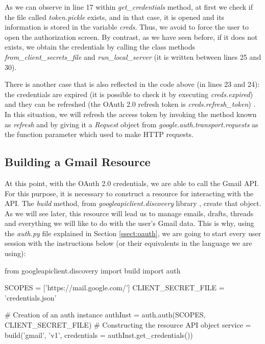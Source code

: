 As we can observe in line 17 within \textit{get\_credentials} method, at first we check if the file called \textit{token.pickle} exists, and in that case, it is opened and its information is stored in the variable \textit{creds}. Thus, we avoid to force the user to open the authorization screen. By contrast, as we have seen before, if it does not exists, we obtain the credentials by calling the class methods \textit{from\_client\_secrets\_file} and \textit{run\_local\_server} (it is written between lines 25 and 30).

There is another case that is also reflected in the code above (in lines 23 and 24): the credentials are expired (it is possible to check it by executing \textit{creds.expired}) and they can be refreshed (the OAuth 2.0 refresh token is \textit{creds.refresh\_token}) \citep{oauth2.credentials}. In this situation, we will refresh the access token by invoking the method known as \textit{refresh} and by giving it a \textit{Request} object \citep{request-lib} from \textit{google.auth.transport.requests} as the function parameter which used to make HTTP requests.

\subsection{Building a Gmail Resource} \label{ssect:gmailres}
At this point, with the OAuth 2.0 credentials, we are able to call the Gmail API. For this purpose, it is necessary to construct a resource \citep[/v1/reference]{gmailAPI} for interacting with the API. The \textit{build} method, from \textit{googleapiclient.discovery} library \citep{build-module}, create that object. As we will see later, this resource will lead us to manage emails, drafts, threads and everything we will like to do with the user's Gmail data. This is why, using the \textit{auth.py} file explained in Section \ref{ssect:oauth}, we are going to start every user session with the instructions below (or their equivalents in the language we are using):

\begin{python}
	from googleapiclient.discovery import build
	import auth
	
	SCOPES = ['https://mail.google.com/']
	CLIENT_SECRET_FILE = 'credentials.json'
	
	# Creation of an auth instance
	authInst = auth.auth(SCOPES, CLIENT_SECRET_FILE)
	# Constructing the resource API object
	service = build('gmail', 'v1', credentials = authInst.get_credentials())
\end{python}


